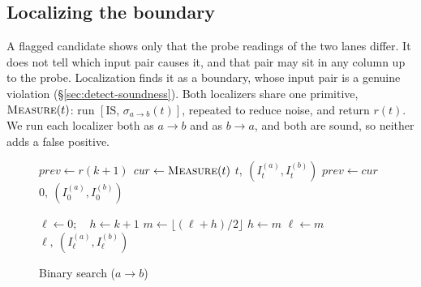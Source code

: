 \documentclass[letterpaper,twocolumn,10pt]{article}
\theoremstyle{definition}
\providecommand{\IS}{\ensuremath{\mathrm{IS}}}
\providecommand{\inp}[2]{\ensuremath{I_{#1}^{(#2)}}}
\providecommand{\batch}[1]{\ensuremath{[\IS,\,#1]}}
\providecommand{\spl}[1]{\ensuremath{\sigma_{a\to b}(#1)}}
\providecommand{\tmax}{\ensuremath{t_{\max}}}
\begin{document}
\subsection{Localizing the boundary}
\label{sec:detect-localize}

A flagged candidate shows only that the probe readings of the two lanes differ. It does not tell
which input pair causes it, and that pair may sit in any column up to the probe.
Localization finds it as a boundary, whose input pair is a genuine violation
(\S\ref{sec:detect-soundness}). Both localizers share one primitive, $\textsc{Measure}(t)$:
run $\batch{\spl{t}}$, repeated to reduce noise, and return $r(t)$. We run each localizer both as
$a\to b$ and as $b\to a$, and both are sound, so neither adds a false positive.

\begin{figure}[t]
\begin{minipage}[t]{0.48\textwidth}
\begin{algorithm}[H]
\caption{Linear scan ($a\!\to\!b$), returns $\tmax$}
\label{alg:scan}
\begin{algorithmic}[1]
\State $\mathit{prev} \gets r(k{+}1)$ 
  \State $\mathit{cur} \gets \textsc{Measure}(t)$
     \State \Return $t,\ (\inp{t}{a}, \inp{t}{b})$ 
  \EndIf
  \State $\mathit{prev} \gets \mathit{cur}$
\EndFor
\State \Return $0,\ (\inp{0}{a}, \inp{0}{b})$
\Statex
\end{algorithmic}
\end{algorithm}
\end{minipage}\hfill
\begin{minipage}[t]{0.48\textwidth}
\begin{algorithm}[H]
\caption{Binary search ($a\!\to\!b$)}
\label{alg:binsearch}
\begin{algorithmic}[1]
\State $\ell \gets 0;\quad h \gets k{+}1$ 
  \State $m \gets \lfloor (\ell+h)/2 \rfloor$
     \State $h \gets m$ 
  \Else
     \State $\ell \gets m$ 
  \EndIf
\EndWhile
\State \Return $\ell,\ (\inp{\ell}{a}, \inp{\ell}{b})$
\end{algorithmic}
\end{algorithm}
\end{minipage}
\end{figure}
\end{document}
